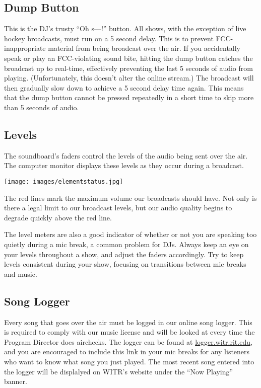 \documentclass{witrman}
\begin{document}
\subsection{Dump Button}

This is the DJ's trusty ``Oh s---!'' button.  All shows, with the exception of
live hockey broadcasts, must run on a 5 second delay.  This is to prevent
FCC-inappropriate material from being broadcast over the air.  If you
accidentally speak or play an FCC-violating sound bite, hitting the dump button
catches the broadcast up to real-time, effectively preventing the last 5 seconds
of audio from playing.  (Unfortunately, this doesn't alter the online stream.)
The broadcast will then gradually slow down to achieve a 5 second delay time
again.  This means that the dump button cannot be pressed repeatedly in a short
time to skip more than 5 seconds of audio.

\subsection{Levels}

The soundboard's faders control the levels of the audio being sent over the air.
The computer monitor displays these levels as they occur during a broadcast.

\texttt{[image: images/elementstatus.jpg]}

The red lines mark the maximum volume our broadcasts should have.  Not only is
there a legal limit to our broadcast levels, but our audio quality begins to
degrade quickly above the red line.

The level meters are also a good indicator of whether or not you are speaking
too quietly during a mic break, a common problem for DJs. Always keep an eye on
your levels throughout a show, and adjust the faders accordingly.  Try to keep
levels consistent during your show, focusing on transitions between mic breaks
and music.

\subsection{Song Logger}

Every song that goes over the air must be logged in our online song logger.
This is required to comply with our music license and will be looked at every
time the Program Director does airchecks.  The logger can be found at
\href{https://logger.witr.rit.edu}{logger.witr.rit.edu}, and you are encouraged
to include this link in your mic breaks for any listeners who want to know
what song you just played. The most recent song entered into the
logger will be displalyed on WITR's website under the ``Now Playing'' banner.
\end{document}
